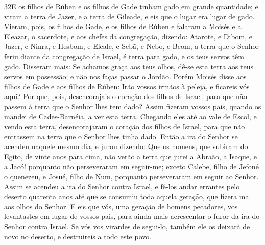 \medskip

\lettrine{32} E os filhos de Rúben e os filhos de Gade tinham
gado em grande quantidade; e viram a terra de Jazer, e a terra de
Gileade, e eis que o lugar era lugar de gado. Vieram, pois, os
filhos de Gade, e os filhos de Rúben e falaram a Moisés e a Eleazar,
o sacerdote, e aos chefes da congregação, dizendo: Atarote, e
Dibom, e Jazer, e Ninra, e Hesbom, e Eleale, e Sebã, e Nebo, e Beom,
a terra que o Senhor feriu diante da congregação de Israel, é
terra para gado, e os teus servos têm gado. Disseram mais: Se
achamos graça aos teus olhos, dê-se esta terra aos teus servos em
possessão; e não nos faças passar o Jordão. Porém Moisés disse
aos filhos de Gade e aos filhos de Rúben: Irão vossos irmãos à
peleja, e ficareis vós aqui? Por que, pois, desencorajais o
coração dos filhos de Israel, para que não passem à terra que o
Senhor lhes tem dado? Assim fizeram vossos pais, quando os
mandei de Cades-Barnéia, a ver esta terra. Chegando eles até ao
vale de Escol, e vendo esta terra, desencorajaram o coração dos
filhos de Israel, para que não entrassem na terra que o Senhor lhes
tinha dado. Então a ira do Senhor se acendeu naquele mesmo
dia, e jurou dizendo: Que os homens, que subiram do Egito, de
vinte anos para cima, não verão a terra que jurei a Abraão, a
Isaque, e a Jacó! porquanto não perseveraram em seguir-me;
exceto Calebe, filho de Jefoné o quenezeu, e Josué, filho de
Num, porquanto perseveraram em seguir ao Senhor. Assim se
acendeu a ira do Senhor contra Israel, e fê-los andar errantes pelo
deserto quarenta anos até que se consumiu toda aquela geração, que
fizera mal aos olhos do Senhor. E eis que vós, uma geração de
homens pecadores, vos levantastes em lugar de vossos pais, para
ainda mais acrescentar o furor da ira do Senhor contra Israel.
Se vós vos virardes de segui-lo, também ele os deixará de
novo no deserto, e destruireis a todo este povo.

